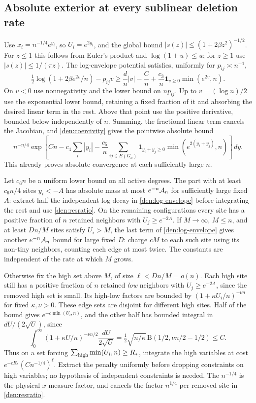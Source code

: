 \subsection{Absolute exterior at every sublinear deletion rate}

Use \(x_i=n^{-1/4}e^{y_i}\), so \(U_i=e^{2y_i}\), and the global bound \(|s(z)|\le (1+2\beta z^2)^{-1/2}\). For \(z\le1\) this follows from Euler's product and \(\log(1+u)\le u\); for \(z\ge1\) use \(|s(z)|\le1/(\pi z)\). The log-envelope potential satisfies, uniformly for \(p_{ij}\asymp n^{-1}\),
\[
 \tfrac12\log(1+2\beta e^{2v}/n)-p_{ij}v
 \ge \frac d n |v|-\frac C n+
       \frac {c_3}n\mathbf1_{v\ge0}\min(e^{2v},n).
\]
On \(v<0\) use nonnegativity and the lower bound on \(np_{ij}\). Up to \(v=(\log n)/2\) use the exponential lower bound, retaining a fixed fraction of it and absorbing the desired linear term in the rest. Above that point use the positive derivative, bounded below independently of \(n\). Summing, the fractional linear term cancels the Jacobian, and \eqref{den:coercivity} gives the pointwise absolute bound
\begin{equation}\label{den:log-envelope}
 n^{-n/4}\exp\!\left[
   Cn-c_4\sum_i|y_i|-\frac{c_5}{n}
     \sum_{ij\in E(G_n)}
       \mathbf1_{y_i+y_j\ge0}\min(e^{2(y_i+y_j)},n)\right]\,dy .
\end{equation}
This already proves absolute convergence at each sufficiently large \(n\).

Let \(c_6n\) be a uniform lower bound on all active degrees. The part with at least \(c_6n/4\) sites \(y_i<-A\) has absolute mass at most \(e^{-n}{\cal A}_n\) for sufficiently large fixed \(A\): extract half the independent log decay in \eqref{den:log-envelope} before integrating the rest and use \eqref{den:resratio}. On the remaining configurations every site has a positive fraction of \(n\) retained neighbors with \(U_j\ge e^{-2A}\). If \(M\to\infty\), \(M\le n\), and at least \(D n/M\) sites satisfy \(U_i>M\), the last term of \eqref{den:log-envelope} gives another \(e^{-n}{\cal A}_n\) bound for large fixed \(D\): charge \(cM\) to each such site using its non-tiny neighbors, counting each edge at most twice. The constants are independent of the rate at which \(M\) grows.

Otherwise fix the high set above \(M\), of size \(\ell<Dn/M=o(n)\). Each high site still has a positive fraction of \(n\) retained \emph{low} neighbors with \(U_j\ge e^{-2A}\), since the removed high set is small. Its high-low factors are bounded by \((1+\kappa U_i/n)^{-\nu n}\) for fixed \(\kappa,\nu>0\). These edge sets are disjoint for different high sites. Half of the bound gives \(e^{-c\min(U_i,n)}\), and the other half has bounded integral in \(dU/(2\sqrt U)\), since
\[
 \int_0^\infty (1+\kappa U/n)^{-\nu n/2}\frac{dU}{2\sqrt U}
  =\tfrac12\sqrt{n/\kappa}\,
    \mathrm B(1/2,\nu n/2-1/2)\le C.
\]
Thus on a set forcing \(\sum_{\rm high}\min(U_i,n)\ge R_*\), integrate the high variables at cost \(e^{-cR_*}(Cn^{-1/4})^\ell\). Extract the penalty uniformly before dropping constraints on high variables; no hypothesis of independent constraints is needed. The \(n^{-1/4}\) is the physical \(x\)-measure factor, and cancels the factor \(n^{1/4}\) per removed site in \eqref{den:resratio}.

